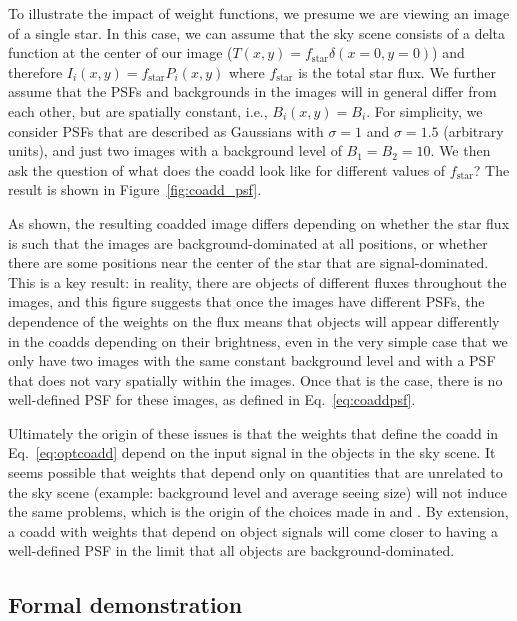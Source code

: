 \documentclass[modern]{style_and_logos/lsstdescnote}
\begin{document}
To illustrate the impact of weight functions, we presume we are viewing an image of a single star.  In this case, we can assume that the sky scene consists of a delta function at the center of our image ($T(x,y)=f_\text{star}\delta(x=0,y=0)$) and therefore $I_i(x,y)=f_\text{star}P_i(x,y)$ where $f_\text{star}$ is the total star flux.  We further assume that the PSFs and backgrounds in the images will in general differ from each other, but are spatially constant, i.e., $B_i(x,y)=B_i$.  For simplicity, we consider PSFs that are described as Gaussians with $\sigma=1$ and $\sigma=1.5$ (arbitrary units), and just two images with a background level of $B_1=B_2=10$.  We then ask the question of what does the coadd look like for different values of $f_\text{star}$?  The result is shown in Figure~\ref{fig:coadd_psf}.

As shown, the resulting coadded image differs depending on whether the star flux is such that the images are background-dominated at all positions, or whether there are some positions near the center of the star that are signal-dominated.  This is a key result: in reality, there are objects of different fluxes throughout the images, and this figure suggests that once the images have different PSFs, the dependence of the weights on the flux means that objects will appear differently in the coadds depending on their brightness, even in the very simple case that we only have two images with the same constant background level and with a PSF that does not vary spatially within the images.  Once that is the case, there is no well-defined PSF for these images, as defined in Eq.~\eqref{eq:coaddpsf}.

Ultimately the origin of these issues is that the weights that define the coadd in Eq.~\eqref{eq:optcoadd} depend on the input signal in the objects in the sky scene.  It seems possible that weights that depend only on quantities that are unrelated to the sky scene (example: background level and average seeing size) will not induce the same problems, which is the origin of the choices made in \citet{2014ApJ...794..120A} and \citet{2017ApJ...836..187Z}.  By extension, a coadd with weights that depend on object signals will come closer to having a well-defined PSF in the limit that all objects are background-dominated.

 \subsection{Formal demonstration}\label{subsec:formal}
\end{document}
